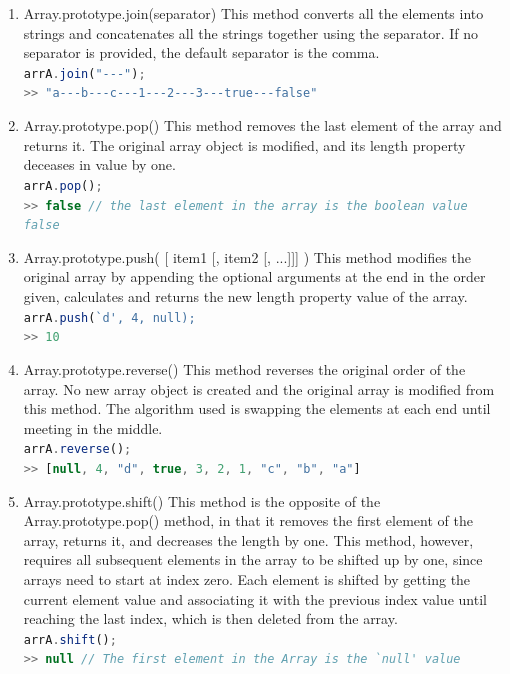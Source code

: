 \documentclass[a4paper,11pt,twoside]{report}
\def\jsinline{\lstinline[language=JavaScript, basicstyle=\small]}%\end{lstlisting}
\begin{document}
\begin{enumerate}
\item Array.prototype.join(separator) \newline
This method converts all the elements into strings and concatenates all the strings together using the separator. If no separator is provided, the default separator is the comma.\\
\jsinline|arrA.join("---");|\\
\jsinline|>> "a---b---c---1---2---3---true---false"|

\item Array.prototype.pop() \newline
This method removes the last element of the array and returns it. The original array object is modified, and its length property deceases in value by one.\\
\jsinline|arrA.pop();|\\
\jsinline|>> false // the last element in the array is the boolean value false |

\item Array.prototype.push( [ item1 [, item2 [, ...]]] ) \newline
This method modifies the original array by appending the optional arguments at the end in the order given, calculates and returns the new length property value of the array.\\
\jsinline|arrA.push(`d', 4, null);|\\
\jsinline|>> 10 |

\item Array.prototype.reverse() \newline
This method reverses the original order of the array. No new array object is created and the original array is modified from this method. The algorithm used is swapping the elements at each end until meeting in the middle.\\
\jsinline|arrA.reverse();|\\
\jsinline|>> [null, 4, "d", true, 3, 2, 1, "c", "b", "a"]|

\item Array.prototype.shift() \newline
This method is the opposite of the Array.prototype.pop() method, in that it removes the first element of the array, returns it, and decreases the length by one. This method, however, requires all subsequent elements in the array to be shifted up by one, since arrays need to start at index zero. Each element is shifted by getting the current element value and associating it with the previous index value until reaching the last index, which is then deleted from the array.\\
\jsinline|arrA.shift();|\\
\jsinline|>> null // The first element in the Array is the `null' value |


\end{enumerate}
\end{document}
